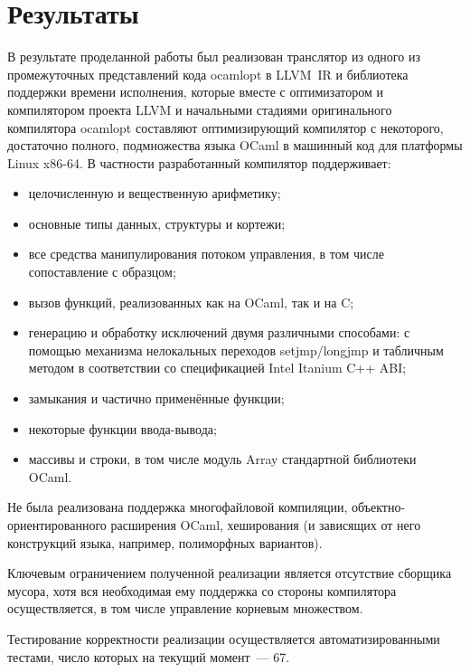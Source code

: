 \documentclass[a4paper, 12pt]{article}
\begin{document}
\section{Результаты}
В результате проделанной работы был реализован транслятор из одного из промежуточных представлений кода ocamlopt в
LLVM~IR и библиотека поддержки времени исполнения, которые вместе с оптимизатором и компилятором проекта LLVM и
начальными стадиями оригинального компилятора ocamlopt составляют оптимизирующий компилятор с некоторого, достаточно
полного, подмножества языка OCaml в машинный код для платформы Linux x86-64. В частности разработанный компилятор
поддерживает:
\begin{itemize}
  \item целочисленную и вещественную арифметику;
  \item основные типы данных, структуры и кортежи;
  \item все средства манипулирования потоком управления, в том числе сопоставление с образцом;
  \item вызов функций, реализованных как на OCaml, так и на C;
  \item генерацию и обработку исключений двумя различными способами: с помощью механизма нелокальных
переходов setjmp/longjmp и табличным методом в соответствии со спецификацией Intel Itanium C++ ABI;
  \item замыкания и частично применённые функции;
  \item некоторые функции ввода-вывода;
  \item массивы и строки, в том числе модуль Array стандартной библиотеки OCaml.
\end{itemize}
Не была реализована поддержка многофайловой компиляции, объектно-ориентированного расширения OCaml,
хеширования (и зависящих от него конструкций языка, например, полиморфных вариантов).

Ключевым ограничением полученной реализации является отсутствие сборщика мусора, хотя вся необходимая ему
поддержка со стороны компилятора осуществляется, в том числе управление корневым множеством.

Тестирование корректности реализации осуществляется автоматизированными тестами, число которых на текущий момент~--- 67.
\end{document}
